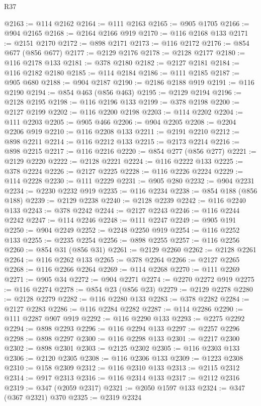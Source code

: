 \begin{lexlean}{R37}
\begin{coremodule}
@2163 := @114 @2162
@2164 := @111 @2163
@2165 := @905 @1705
@2166 := @904 @2165
@2168 := @2164 @2166 @919
@2170 := @116 @2168 @133
@2171 := @2151 @2170
@2172 := @898 @2171
@2173 := @116 @2172
@2176 := @854 @677 (@856 @677)
@2177 := @2129 @2176
@2178 := @2128 @2177
@2180 := @116 @2178 @133
@2181 := @378 @2180
@2182 := @2127 @2181
@2184 := @116 @2182 @2180
@2185 := @114 @2184
@2186 := @111 @2185
@2187 := @905 @680
@2188 := @904 @2187
@2190 := @2186 @2188 @919
@2191 := @116 @2190
@2194 := @854 @463 (@856 @463)
@2195 := @2129 @2194
@2196 := @2128 @2195
@2198 := @116 @2196 @133
@2199 := @378 @2198
@2200 := @2127 @2199
@2202 := @116 @2200 @2198
@2203 := @114 @2202
@2204 := @111 @2203
@2205 := @905 @466
@2206 := @904 @2205
@2208 := @2204 @2206 @919
@2210 := @116 @2208 @133
@2211 := @2191 @2210
@2212 := @898 @2211
@2214 := @116 @2212 @133
@2215 := @2173 @2214
@2216 := @898 @2215
@2217 := @116 @2216
@2220 := @854 @277 (@856 @277)
@2221 := @2129 @2220
@2222 := @2128 @2221
@2224 := @116 @2222 @133
@2225 := @378 @2224
@2226 := @2127 @2225
@2228 := @116 @2226 @2224
@2229 := @114 @2228
@2230 := @111 @2229
@2231 := @905 @280
@2232 := @904 @2231
@2234 := @2230 @2232 @919
@2235 := @116 @2234
@2238 := @854 @188 (@856 @188)
@2239 := @2129 @2238
@2240 := @2128 @2239
@2242 := @116 @2240 @133
@2243 := @378 @2242
@2244 := @2127 @2243
@2246 := @116 @2244 @2242
@2247 := @114 @2246
@2248 := @111 @2247
@2249 := @905 @191
@2250 := @904 @2249
@2252 := @2248 @2250 @919
@2254 := @116 @2252 @133
@2255 := @2235 @2254
@2256 := @898 @2255
@2257 := @116 @2256
@2260 := @854 @31 (@856 @31)
@2261 := @2129 @2260
@2262 := @2128 @2261
@2264 := @116 @2262 @133
@2265 := @378 @2264
@2266 := @2127 @2265
@2268 := @116 @2266 @2264
@2269 := @114 @2268
@2270 := @111 @2269
@2271 := @905 @34
@2272 := @904 @2271
@2274 := @2270 @2272 @919
@2275 := @116 @2274
@2278 := @854 @23 (@856 @23)
@2279 := @2129 @2278
@2280 := @2128 @2279
@2282 := @116 @2280 @133
@2283 := @378 @2282
@2284 := @2127 @2283
@2286 := @116 @2284 @2282
@2287 := @114 @2286
@2290 := @111 @2287 @907 @919
@2292 := @116 @2290 @133
@2293 := @2275 @2292
@2294 := @898 @2293
@2296 := @116 @2294 @133
@2297 := @2257 @2296
@2298 := @898 @2297
@2300 := @116 @2298 @133
@2301 := @2217 @2300
@2302 := @898 @2301
@2303 := @2125 @2302
@2305 := @116 @2303 @133
@2306 := @2120 @2305
@2308 := @116 @2306 @133
@2309 := @1223 @2308
@2310 := @158 @2309
@2312 := @116 @2310 @133
@2313 := @2115 @2312
@2314 := @917 @2313
@2316 := @116 @2314 @133
@2317 := @2112 @2316
@2319 := @347 (@2059 @2317)
@2321 := @2050 @1597 @133
@2324 := @347 (@367 @2321) @370
@2325 := @2319 @2324

\end{coremodule}
\end{lexlean}
